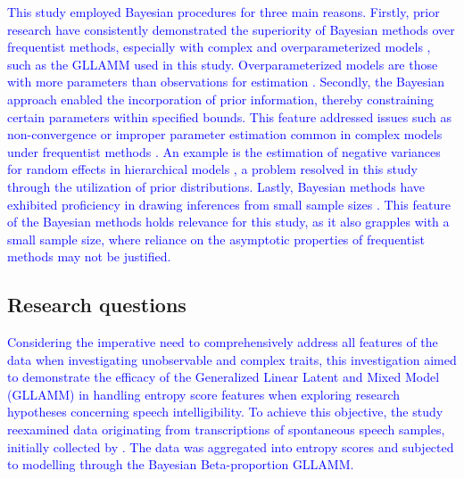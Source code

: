 \documentclass[
  authoryear,
  preprint,
  1p]{elsarticle}
\begin{document}
\textcolor{blue}{This study employed Bayesian procedures for three main reasons.
Firstly, prior research have consistently demonstrated the superiority
of Bayesian methods over frequentist methods, especially with complex
and overparameterized models \citep{Baker_1998, Kim_et_al_1999}, such as
the GLLAMM used in this study. Overparameterized models are those with
more parameters than observations for estimation
\citep{Everitt_et_al_2010}. Secondly, the Bayesian approach enabled the
incorporation of prior information, thereby constraining certain
parameters within specified bounds. This feature addressed issues such
as non-convergence or improper parameter estimation common in complex
models under frequentist methods
\citep{Martin_et_al_1975, Seaman_et_al_2011}. An example is the
estimation of negative variances for random effects in hierarchical
models \citep{Holmes_et_al_2019}, a problem resolved in this study
through the utilization of prior distributions. Lastly, Bayesian methods
have exhibited proficiency in drawing inferences from small sample sizes
\citep{Baldwin_et_al_2013, Lambert_et_al_2005, Depaoli_2014}. This
feature of the Bayesian methods holds relevance for this study, as it
also grapples with a small sample size, where reliance on the asymptotic
properties of frequentist methods may not be justified.}

\subsection{Research questions}\label{sec-I-RQ}

\textcolor{blue}{Considering the imperative need to comprehensively address all features
of the data when investigating unobservable and complex traits, this
investigation aimed to demonstrate the efficacy of the Generalized
Linear Latent and Mixed Model (GLLAMM) in handling entropy score
features when exploring research hypotheses concerning speech
intelligibility. To achieve this objective, the study reexamined data
originating from transcriptions of spontaneous speech samples, initially
collected by \citet{Boonen_et_al_2023}. The data was aggregated into
entropy scores and subjected to modelling through the Bayesian
Beta-proportion GLLAMM.}
\end{document}
